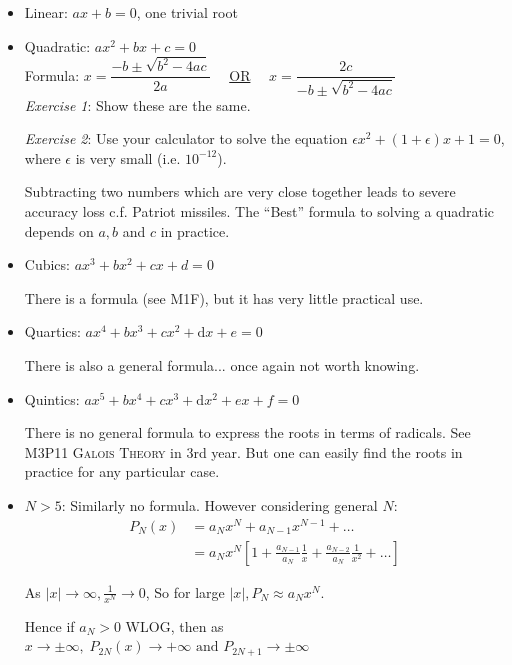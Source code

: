 \documentclass[10pt]{scrartcl}
\begin{document}
\begin{itemize}

\item Linear: $ax + b = 0$, one trivial root

\item Quadratic: $ax^2 + bx + c = 0$\\

Formula: $x = \dfrac{-b \pm \sqrt{b^2 - 4ac}}{2a} \quad$ \underline{OR} $\quad x = \dfrac{2c}{-b \pm \sqrt{b^2 - 4ac}}$\\


\emph{Exercise 1}: Show these are the same. 

\emph{Exercise 2}: Use your calculator to solve the equation $\epsilon x^2 + (1 + \epsilon)x + 1 = 0$, where $\epsilon$ is very small (i.e. $10^{-12}$).

Subtracting two numbers which are very close together leads to severe accuracy loss c.f. Patriot missiles. The ``Best'' formula to solving a quadratic depends on $a, b$ and $c$ in practice.\vsp

\item Cubics: $ax^3 + bx^2 + cx + d = 0$

There is a formula (see M1F),
 but it has very little practical use.\vsp

\item Quartics: $ax^4 + bx^3 + cx^2 + \mathrm{d}x + e = 0$

There is also a general formula... once again not worth knowing.\vsp

\item Quintics: $ax^5 + bx^4 + cx^3 + \mathrm{d}x^2 + ex + f = 0$

There is no general formula to express the roots in terms of radicals. See \textsc{M3P11 Galois Theory} in 3rd year. But one can easily find the roots in practice for any particular case.

\item $N > 5$: Similarly no formula. However considering general $N$:
\begin{align*} \nonumber
P_N(x) &= a_Nx^N + a_{N-1}x^{N-1} + \dots\\ 
&= a_Nx^N\left[1 + \frac{a_{N-1}}{a_N} \frac{1}{x} + \frac{a_{N-2}}{a_N} \frac{1}{x^2} + \dots \right]
\end{align*}


As ${ |x| \to \infty, \frac{1}{x^N} \to 0 }$, So for large $|x|, P_N \approx a_Nx^N$. 

Hence if $a_N > 0$ WLOG, then as $\displaystyle{x \to \pm \infty , \; P_{2N}(x) \to +\infty \text{ and } P_{2N+1} \to \pm \infty }$\\ 


\end{itemize}
\end{document}
